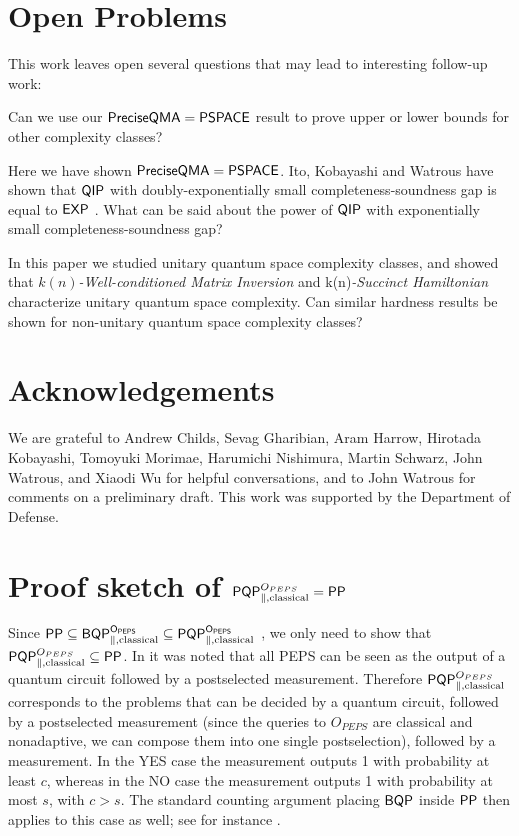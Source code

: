 \documentclass[11pt]{article}
\theoremstyle{definition}
\theoremstyle{remark}
\theoremstyle{definition}
\newcommand\EXP{{\sf{EXP}}}
\newcommand\QIP{{\sf{QIP}}}
\newcommand\PSPACE{{\sf{PSPACE}}}
\newcommand\PP{\sf{PP}}
\newcommand\BQP{{\sf{BQP}}}
\newcommand\PQP{{\sf{PQP}}}
\newcommand\QMAexp{{\sf{PreciseQMA}}}
\newcommand\matrixinvert[1]{{\ensuremath{#1}}\textit{-Well-conditioned Matrix Inversion}}
\newcommand\spechamiltonian[1]{#1\textit{-Succinct Hamiltonian}}
\begin{document}
\section{Open Problems}
This work leaves open several questions that may lead to interesting follow-up work:
\begin{enumerate}
\begin{item} Can we use our $\QMAexp=\PSPACE$ result to prove upper or lower bounds for other complexity classes? \end{item}
\begin{item} Here we have shown $\QMAexp=\PSPACE$.  Ito, Kobayashi and Watrous  have shown that $\QIP$ with doubly-exponentially small completeness-soundness gap is equal to $\EXP$ \cite{ikw12}.  What can be said about the power of $\QIP$ with exponentially small completeness-soundness gap?\end{item}
\begin{item}In this paper we studied unitary quantum space complexity classes, and showed that \matrixinvert{k(n)} and \spechamiltonian{k(n)} characterize unitary quantum space complexity.  Can similar hardness results be shown for non-unitary quantum space complexity classes?\end{item}
\end{enumerate}


\section{Acknowledgements}
We are grateful to Andrew Childs, Sevag Gharibian, Aram Harrow, Hirotada Kobayashi, Tomoyuki Morimae, Harumichi Nishimura, Martin Schwarz, John Watrous, and Xiaodi Wu for helpful conversations, and to John Watrous for comments on a preliminary draft. This work was supported by the Department of Defense.

 


\appendix

\section{Proof sketch of $\PQP^{O_{PEPS}}_{\parallel,\text{classical}} = \PP$} \label{app:peps}
Since $\PP \subseteq \BQP^{O_{PEPS}}_{\parallel,\text{classical}} \subseteq \PQP^{O_{PEPS}}_{\parallel,\text{classical}}$ \cite{swv07}, we only need to show that $\PQP^{O_{PEPS}}_{\parallel,\text{classical}} \subseteq \PP$. In \cite{swv07} it was noted that all PEPS can be seen as the output of a quantum circuit followed by a postselected measurement. Therefore $\PQP^{O_{PEPS}}_{\parallel,\text{classical}}$ corresponds to the problems that can be decided by a quantum circuit, followed by a postselected measurement (since the queries to $O_{PEPS}$ are classical and nonadaptive, we can compose them into one single postselection), followed by a measurement. In the YES case the measurement outputs 1 with probability at least $c$, whereas in the NO case the measurement outputs 1 with probability at most $s$, with $c > s$. The standard counting argument placing $\BQP$ inside $\PP$ then applies to this case as well; see for instance \cite[Propositions~2~and~3]{aaronson05}.
\end{document}
